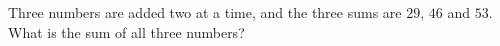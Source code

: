Three numbers are added two at a time, and the three sums are $29$, $46$ and $53$. What is the sum of all three numbers?
